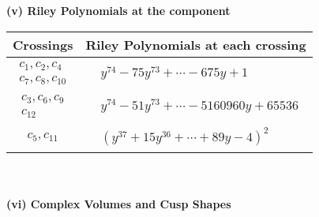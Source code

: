 \documentclass[1p]{elsarticle_modified}
\theoremstyle{definition}
\begin{document}
\newpage\renewcommand{\arraystretch}{1}
\flushleft \textbf{(v) Riley Polynomials at the component}\newline \\
\begin{tabular}{m{50pt}|m{274pt}}
Crossings & \hspace{64pt}Riley Polynomials at each crossing \\
\hline $$\begin{aligned}c_{1},c_{2},c_{4}\\c_{7},c_{8},c_{10}\end{aligned}$$&$\begin{aligned}
&y^{74}-75 y^{73}+\cdots-675 y+1
\end{aligned}$\\
\hline $$\begin{aligned}c_{3},c_{6},c_{9}\\c_{12}\end{aligned}$$&$\begin{aligned}
&y^{74}-51 y^{73}+\cdots-5160960 y+65536
\end{aligned}$\\
\hline $$\begin{aligned}c_{5},c_{11}\end{aligned}$$&$\begin{aligned}
&(y^{37}+15 y^{36}+\cdots+89 y-4)^{2}
\end{aligned}$\\
\hline
\end{tabular}\\~\\
\newpage\flushleft \textbf{(vi) Complex Volumes and Cusp Shapes}
\end{document}
